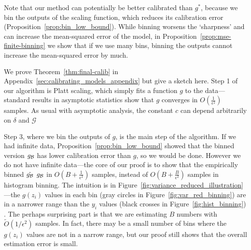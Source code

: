 \begin{theorem}
\label{thm:final-calib}
\finalCalibText{}
\end{theorem}

\newtheorem*{finalCalib}{Restatement of Theorem~\ref{thm:final-calib}}


Note that our method can potentially be better calibrated than $g^*$, because we bin the outputs of the scaling function, which reduces its calibration error (Proposition~\ref{prop:bin_low_bound}). While binning worsens the `sharpness'  and can increase the mean-squared error of the model, in Proposition~\ref{prop:mse-finite-binning} we show that if we use many  bins, binning the outputs cannot increase the mean-squared error by much.

We prove Theorem~\ref{thm:final-calib} in Appendix~\ref{sec:calibrating_models_appendix} but give a sketch here. Step 1 of our algorithm is Platt scaling, which simply fits a function $g$ to the data---standard results in asymptotic statistics show that $g$ converges in $O(\frac{1}{\epsilon^2})$ samples.
As usual with asymptotic analysis, the constant $c$ can depend arbitrarily on $\delta$ and $\mathcal{G}$  

Step 3, where we bin the outputs of $g$, is the main step of the algorithm. If we had infinite data, Proposition~\ref{prop:bin_low_bound} showed that the binned version $g_{\mathcal{B}{}}$ has lower calibration error than $g$, so we would be done. However we do not have infinite data---the core of our proof is to show that the empirically binned $\hat{g_{\mathcal{B}{}}}$   $g_{\mathcal{B}{}}$ in $O(B + \frac{1}{\epsilon^2})$ samples, instead of  $O(B + \frac{B}{\epsilon^2})$ samples  in histogram binning. The intuition is in Figure~\ref{fig:variance_reduced_illustration}---the $g(z_i)$ values in each bin (gray circles in Figure~\ref{fig:var_red_binning}) are in a narrower range than the $y_i$ values (black crosses in Figure~\ref{fig:hist_binning}) . The perhaps surprising part is that we are estimating $B$ numbers with $\widetilde{O}(1/\epsilon^2)$ samples. In fact, there may be a small number of bins where the $g(z_i)$ values are not in a narrow range, but our proof still shows that the overall estimation error is small.

